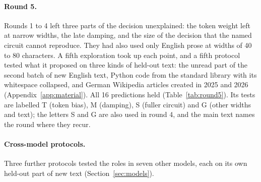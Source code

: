 \documentclass[11pt,a4paper]{article}
\begin{document}
\paragraph{Round 5.} Rounds 1 to 4 left three parts of the decision unexplained: the token weight left at narrow widths, the late damping, and the size of the decision that the named circuit cannot reproduce. They had also used only English prose at widths of 40 to 80 characters. A fifth exploration took up each point, and a fifth protocol tested what it proposed on three kinds of held-out text: the unread part of the second batch of new English text, Python code from the standard library with its whitespace collapsed, and German Wikipedia articles created in 2025 and 2026 (Appendix~\ref{app:material}). All 16 predictions held (Table~\ref{tab:round5}). Its tests are labelled T (token bias), M (damping), S (fuller circuit) and G (other widths and text); the letters S and G are also used in round 4, and the main text names the round where they recur.

\paragraph{Cross-model protocols.} Three further protocols tested the roles in seven other models, each on its own held-out part of new text (Section~\ref{sec:models}).
\end{document}
